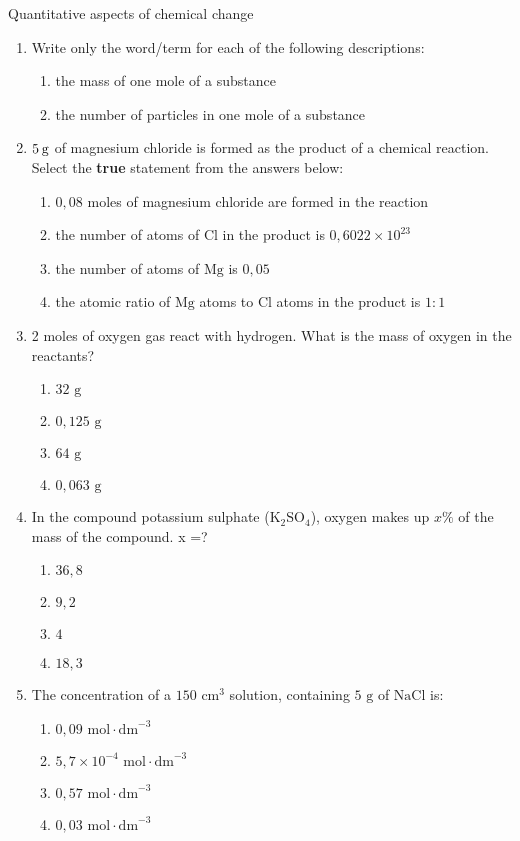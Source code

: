             \begin{eocexercises}{Quantitative aspects of chemical change}
            \nopagebreak \noindent
\begin{enumerate}[noitemsep, label=\textbf{\arabic*}. ] 
\item Write only the word/term for each of the following descriptions:
 \begin{enumerate}[noitemsep, label=\textbf{\alph*}. ] 
 \item the mass of one mole of a substance
 \item the number of particles in one mole of a substance
\end{enumerate}
 \item $5\phantom{\rule{2pt}{0ex}}\text{g}$ of magnesium chloride is formed as the product of a chemical reaction. Select the \textbf{true} statement from the answers below:
  \begin{enumerate}[noitemsep, label=\textbf{\alph*}. ] 
  \item $0,08$ moles of magnesium chloride are formed in the reaction
  \item the number of atoms of $\text{Cl}$ in the product is $0,6022\ensuremath{\times}{10}^{23}$
  \item the number of atoms of $\text{Mg}$ is $0,05$
  \item the atomic ratio of $\text{Mg}$ atoms to $\text{Cl}$ atoms in the product is $1:1$
  \end{enumerate}
 \item 2 moles of oxygen gas react with hydrogen. What is the mass of oxygen in the reactants?
  \begin{enumerate}[noitemsep, label=\textbf{\alph*}. ]
  \item $32 \text{ g}$
  \item $0,125 \text{ g}$
  \item $64 \text{ g}$
  \item $0,063 \text{ g}$
  \end{enumerate}
 \item In the compound potassium sulphate ($\text{K}{}_{2}\text{SO}{}_{4}$), oxygen makes up $x\%$ of the mass of the compound. x =?
  \begin{enumerate}[noitemsep, label=\textbf{\alph*}. ]
  \item $36,8$
  \item $9,2$
  \item $4$
  \item $18,3$
  \end{enumerate}
 \item The concentration of a $150 {\text{ cm}}^{3}$ solution, containing $5 \text{ g}$ of $\text{NaCl}$ is:
  \begin{enumerate}[noitemsep, label=\textbf{\alph*}. ]
  \item $0,09 \text{ mol} \cdot \text{dm}^{-3}$
  \item $5,7 \times 10^{-4} \text{ mol} \cdot \text{dm}^{-3}$
  \item $0,57 \text{ mol} \cdot \text{dm}^{-3}$
  \item $0,03 \text{ mol} \cdot \text{dm}^{-3}$
  \end{enumerate}


\end{enumerate}
\end{eocexercises}
